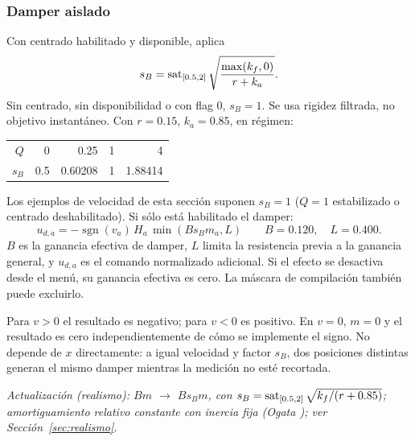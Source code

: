 \subsubsection{Damper aislado}
Con centrado habilitado y disponible,  aplica
\begin{equation}s_B=\operatorname{sat}_{[0.5,2]}\sqrt{\frac{\max(k_f,0)}{r+k_a}}.\end{equation}
Sin centrado, sin disponibilidad o con flag 0, $s_B=1$. Se usa rigidez filtrada, no objetivo instantáneo. Con $r=0.15$, $k_a=0.85$, en régimen:
\begin{center}\begin{tabular}{rrrrr}\toprule $Q$&0&0.25&1&4\\ $s_B$&0.5&0.60208&1&1.88414\\\bottomrule\end{tabular}\end{center}
Los ejemplos de velocidad de esta sección suponen $s_B=1$ ($Q=1$ estabilizado o centrado deshabilitado). Si sólo está habilitado el damper:
\begin{equation}
\boxed{u_{d,a}=-\operatorname{sgn}(v_a)\,H_a\,\min(Bs_Bm_a,L)}
\qquad B=0.120,\quad L=0.400.
\label{eq:damper_aislado}
\end{equation}
$B$ es la ganancia efectiva de damper, $L$ limita la resistencia previa a la ganancia general, y $u_{d,a}$ es el comando normalizado adicional. Si el efecto se desactiva desde el menú, su ganancia efectiva es cero. La máscara de compilación también puede excluirlo.

Para $v>0$ el resultado es negativo; para $v<0$ es positivo. En $v=0$, $m=0$ y el resultado es cero independientemente de cómo se implemente el signo. No depende de $x$ directamente: a igual velocidad y factor $s_B$, dos posiciones distintas generan el mismo damper mientras la medición no esté recortada.

\textit{Actualización (realismo): $Bm$ $\rightarrow$ $Bs_Bm$, con $s_B=\operatorname{sat}_{[0.5,2]}\sqrt{k_f/(r+0.85)}$; amortiguamiento relativo constante con inercia fija (Ogata \cite{ogata}); ver Sección~\ref{sec:realismo}.}

